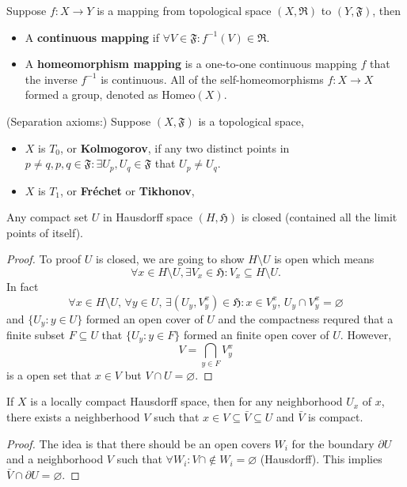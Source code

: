 \begin{definition}
Suppose $f:X\to Y$ is a mapping from topological space $(X,\mathfrak{R})$ to $(Y,\mathfrak{F})$, then
\begin{itemize}
\item A \textbf{continuous mapping} if $\forall V\in \mathfrak{F}: f^{-1}(V)\in\mathfrak{R}$. 
\item A \textbf{homeomorphism mapping} is a one-to-one continuous mapping $f$ that the inverse $f^{-1}$ is continuous. All of the self-homeomorphisms $f:X\to X$ formed a group, denoted as $\text{Homeo}(X)$. 
\end{itemize}
\end{definition}

\begin{definition}(Separation axioms:)
Suppose $(X,\mathfrak{F})$ is a topological space,
\begin{itemize}
\item $X$ is $T_0$, or \textbf{Kolmogorov}, if any two distinct points in $p\ne q,p,q\in\mathfrak{F}: \exists U_p,U_q\in\mathfrak{F}$ that $U_p\ne U_q$.
\item $X$ is $T_1$, or \textbf{Fr\'{e}chet} or \textbf{Tikhonov},  
\end{itemize}
\end{definition}

\begin{theorem}
Any compact set $U$ in Hausdorff space $(H,\mathfrak{H})$ is closed (contained all the limit points of itself).
\end{theorem}

\begin{proof}
To proof $U$ is closed, we are going to show $H\setminus U$ is open which means
\begin{equation}
\forall x\in H\setminus U, \exists V_x\in\mathfrak{H}: V_x\subseteq H\setminus U.
\end{equation}
In fact
\begin{equation}
\forall x\in H\setminus U,\,\forall y\in U,\,\exists (U_y,V_y^x)\in\mathfrak{H}: x\in V_y^x,\,U_y\cap V_y^x=\varnothing
\end{equation}
and $\{U_y:y\in U\}$ formed an open cover of $U$ and the compactness requred that a finite subset $F\subseteq U$ that $\{U_y:y\in F\}$ formed an finite open cover of $U$. However, 
\begin{equation}
V=\bigcap_{y\in F}V_y^x
\end{equation}
is a open set that $x\in V$ but $V\cap U=\varnothing$.
\end{proof}

\begin{theorem}
If $X$ is a locally compact Hausdorff space, then for any neighborhood $U_x$ of $x$, there exists a neighberhood $V$ such that $x\in V\subseteq\bar V\subseteq U$ and $\bar V$ is compact.
\end{theorem}
\begin{proof}
The idea is that there should be an open covers ${W_i}$ for the boundary $\partial U$ and a neighborhood $V$ such that $\forall W_i: V\cap\notin W_i=\varnothing$ (Hausdorff). This implies $\bar V\cap \partial U=\varnothing$.  
\end{proof}